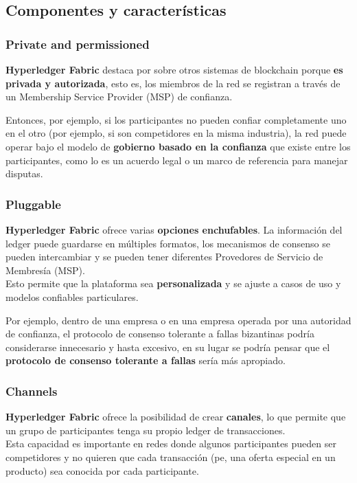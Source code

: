 \documentclass{beamer}
\begin{document}
	\subsection{Componentes y características}
	
	\begin{frame}
		\frametitle{Private and permissioned}
		\textbf{Hyperledger Fabric} destaca por sobre otros sistemas de blockchain porque \textbf{es privada y autorizada}, esto es, los miembros de la red se registran a través de un Membership Service Provider (MSP) de confianza.\\
	\end{frame}

	\begin{frame}
		Entonces, por ejemplo, si los participantes no pueden confiar completamente uno en el otro (por ejemplo, si son competidores en la misma industria), la red puede operar bajo el modelo de \textbf{gobierno  basado en la confianza} que existe entre los participantes, como lo es un acuerdo legal o un marco de referencia para manejar disputas.
	\end{frame}
	
	\begin{frame}
		\frametitle{Pluggable}
		\textbf{Hyperledger Fabric} ofrece varias \textbf{opciones enchufables}. La información del ledger puede guardarse en múltiples formatos, los mecanismos de consenso se pueden intercambiar y se pueden tener diferentes Provedores de Servicio de Membresía (MSP).\\
		\vspace{4mm}
		Esto permite que la plataforma sea \textbf{personalizada} y se ajuste a casos de uso y modelos confiables particulares.
	\end{frame}

	\begin{frame}	
		Por ejemplo, dentro de una empresa o en una empresa operada por una autoridad de confianza, el protocolo de consenso tolerante a fallas bizantinas podría considerarse innecesario y hasta excesivo, en su lugar se podría pensar que el \textbf{protocolo de consenso tolerante a fallas} sería más apropiado.
	\end{frame}
	
	\begin{frame}
		\frametitle{Channels}
		\textbf{Hyperledger Fabric} ofrece la posibilidad de crear \textbf{canales}, lo que permite que un grupo de participantes tenga su propio ledger de transacciones.\\
		\vspace{4mm}
		Esta capacidad es importante en redes donde algunos participantes pueden ser competidores y no quieren que cada transacción (pe, una oferta especial en un producto) sea conocida por cada participante.
	\end{frame}
\end{document}

